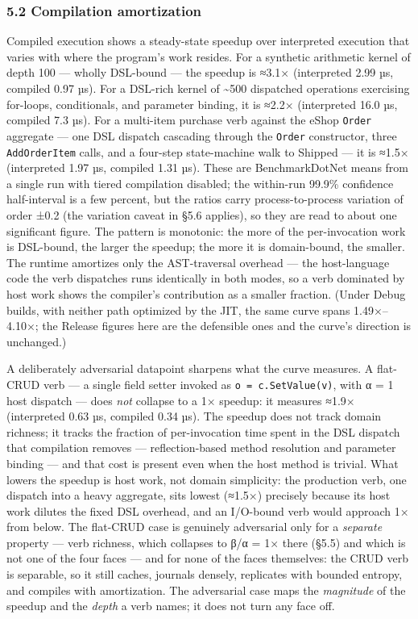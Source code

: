 \documentclass[
]{article}
\newcounter{none} %
\let\origtexttt\texttt%
\renewcommand{\texttt}[1]{\origtexttt{\seqsplit{#1}}}%
\let\texttt\origtexttt%
\begin{document}
\subsubsection{5.2 Compilation
amortization}\label{compilation-amortization}

Compiled execution shows a steady-state speedup over interpreted
execution that varies with where the program's work resides. For a
synthetic arithmetic kernel of depth 100 --- wholly DSL-bound --- the
speedup is ≈3.1× (interpreted 2.99 µs, compiled 0.97 µs). For a DSL-rich
kernel of \textasciitilde500 dispatched operations exercising for-loops,
conditionals, and parameter binding, it is ≈2.2× (interpreted 16.0 µs,
compiled 7.3 µs). For a multi-item purchase verb against the eShop
\texttt{Order} aggregate --- one DSL dispatch cascading through the
\texttt{Order} constructor, three \texttt{AddOrderItem} calls, and a
four-step state-machine walk to Shipped --- it is ≈1.5× (interpreted
1.97 µs, compiled 1.31 µs). These are BenchmarkDotNet means from a
single run with tiered compilation disabled; the within-run 99.9\%
confidence half-interval is a few percent, but the ratios carry
process-to-process variation of order ±0.2 (the variation caveat in §5.6
applies), so they are read to about one significant figure. The pattern
is monotonic: the more of the per-invocation work is DSL-bound, the
larger the speedup; the more it is domain-bound, the smaller. The
runtime amortizes only the AST-traversal overhead --- the host-language
code the verb dispatches runs identically in both modes, so a verb
dominated by host work shows the compiler's contribution as a smaller
fraction. (Under Debug builds, with neither path optimized by the JIT,
the same curve spans 1.49×--4.10×; the Release figures here are the
defensible ones and the curve's direction is unchanged.)

A deliberately adversarial datapoint sharpens what the curve measures. A
flat-CRUD verb --- a single field setter invoked as
\texttt{o\ =\ c.SetValue(v)}, with α = 1 host dispatch --- does
\emph{not} collapse to a 1× speedup: it measures ≈1.9× (interpreted 0.63
µs, compiled 0.34 µs). The speedup does not track domain richness; it
tracks the fraction of per-invocation time spent in the DSL dispatch
that compilation removes --- reflection-based method resolution and
parameter binding --- and that cost is present even when the host method
is trivial. What lowers the speedup is host work, not domain simplicity:
the production verb, one dispatch into a heavy aggregate, sits lowest
(≈1.5×) precisely because its host work dilutes the fixed DSL overhead,
and an I/O-bound verb would approach 1× from below. The flat-CRUD case
is genuinely adversarial only for a \emph{separate} property --- verb
richness, which collapses to β/α = 1× there (§5.5) and which is not one
of the four faces --- and for none of the faces themselves: the CRUD
verb is separable, so it still caches, journals densely, replicates with
bounded entropy, and compiles with amortization. The adversarial case
maps the \emph{magnitude} of the speedup and the \emph{depth} a verb
names; it does not turn any face off.
\end{document}
